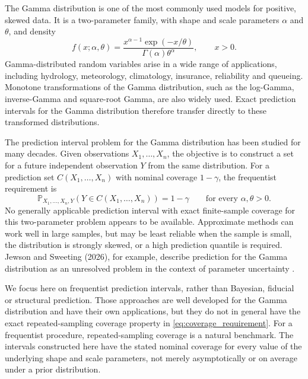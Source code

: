 \documentclass[11pt]{article}
\theoremstyle{remark}
\newcommand{\Pp}{\mathbb P}
\begin{document}
The Gamma distribution is one of the most commonly used models for positive, skewed data. It is a two-parameter family, with shape and scale parameters $\alpha$ and $\theta$, and density
\begin{equation}
 f(x;\alpha,\theta)
 =\frac{x^{\alpha-1}\exp(-x/\theta)}{\Gamma(\alpha)\theta^\alpha},
 \qquad x>0.
 \label{eq:intro_gamma_density}
\end{equation}
Gamma-distributed random variables arise in a wide range of applications, including hydrology, meteorology, climatology, insurance, reliability and queueing. Monotone transformations of the Gamma distribution, such as the log-Gamma, inverse-Gamma and square-root Gamma, are also widely used. Exact prediction intervals for the Gamma distribution therefore transfer directly to these transformed distributions.

The prediction interval problem for the Gamma distribution has been studied for many decades. 
Given observations $X_1,\ldots,X_n$, the objective is to construct a set for a future independent 
observation $Y$ from the same distribution. For a prediction set $C(X_1,\ldots,X_n)$ with nominal 
coverage $1-\gamma$, the frequentist requirement is
\begin{equation}
 \Pp_{X_1,\ldots,X_n,Y}(Y\in C(X_1,\ldots,X_n))=1-\gamma
 \qquad\text{for every }\alpha,\theta>0.
 \label{eq:coverage_requirement}
\end{equation}
No generally applicable prediction interval with exact finite-sample coverage for this two-parameter 
problem appears to be available. Approximate methods can work well in large samples, 
but may be least reliable when the sample is small, the distribution is strongly skewed,
or a high prediction quantile is required. Jewson and Sweeting (2026), for example, describe prediction for the Gamma distribution as an unresolved problem in the context of parameter uncertainty \cite{Jewson2026}.

We focus here on frequentist prediction intervals, rather than Bayesian, fiducial or structural prediction. 
Those approaches are well developed for the Gamma distribution and have their own applications, 
but they do not in general have the exact repeated-sampling coverage property in \eqref{eq:coverage_requirement}. 
For a frequentist procedure, repeated-sampling coverage is a natural benchmark.
The intervals constructed here have the stated nominal coverage for every value of the underlying shape and 
scale parameters, not merely asymptotically or on average under a prior distribution.
\end{document}

